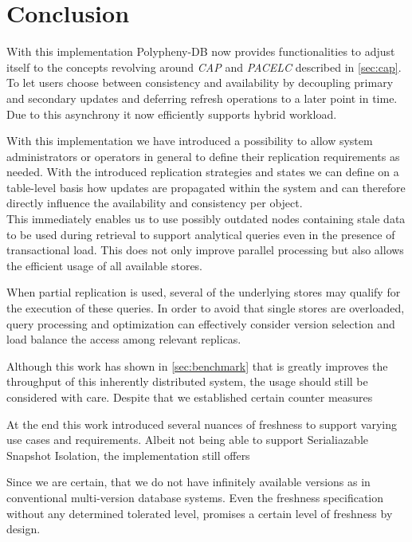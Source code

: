 \chapter{Conclusion}
\label{c:conclusion}


With this implementation Polypheny-DB now provides functionalities to adjust itself to the concepts revolving around \emph{CAP} and \emph{PACELC} described in \ref{sec:cap}.
To let users choose between consistency and availability by decoupling primary and secondary updates and deferring refresh operations to a later point in time.
Due to this asynchrony it now efficiently supports hybrid workload. 


With this implementation we have introduced a possibility to allow system administrators or operators in general to define their replication requirements as needed. 
With the introduced replication strategies and states we can define on a table-level basis how updates are propagated within the system and can therefore directly influence 
the availability and consistency per object.\\
This immediately enables us to use possibly outdated nodes containing stale data to be used during retrieval to support analytical queries even in the presence of transactional load.
This does not only improve parallel processing but also allows the efficient usage of all available stores.





When partial replication is used, several of the underlying stores may qualify
for the execution of these queries. In order to avoid that single stores are overloaded, query processing and optimization
can effectively consider version selection and load balance the access among relevant replicas.

Although this work has shown in \ref{sec:benchmark} that is greatly improves the throughput of this inherently distributed system, the usage should still be considered with care.
Despite that we established certain counter measures 


At the end this work introduced several nuances of freshness to support varying use cases and requirements.
Albeit not being able to support Serialiazable Snapshot Isolation, the implementation still offers 

Since we are certain, that we do not have infinitely available versions as in conventional multi-version database systems.
Even the freshness specification without any determined tolerated level, promises a certain level of freshness by design.


